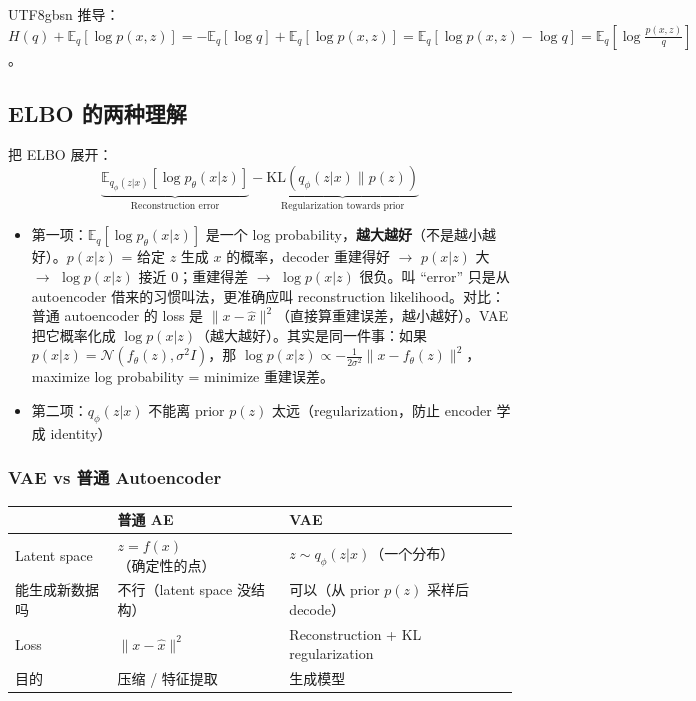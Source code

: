 \documentclass[11pt]{article}
\begin{document}
\begin{CJK}{UTF8}{gbsn}
推导：$H(q) + \mathbb{E}_q[\log p(x,z)] = -\mathbb{E}_q[\log q] + \mathbb{E}_q[\log p(x,z)] = \mathbb{E}_q[\log p(x,z) - \log q] = \mathbb{E}_q\!\left[\log \frac{p(x,z)}{q}\right]$。

\subsection{ELBO 的两种理解}

把 ELBO 展开：
\[
  \underbrace{\mathbb{E}_{q_\phi(z|x)}[\log p_\theta(x|z)]}_{\text{Reconstruction error}} - \underbrace{\mathrm{KL}(q_\phi(z|x) \| p(z))}_{\text{Regularization towards prior}}
\]

\begin{itemize}
  \item 第一项：$\mathbb{E}_q[\log p_\theta(x|z)]$ 是一个 log probability，\textbf{越大越好}（不是越小越好）。$p(x|z)$ = 给定 $z$ 生成 $x$ 的概率，decoder 重建得好 $\to$ $p(x|z)$ 大 $\to$ $\log p(x|z)$ 接近 0；重建得差 $\to$ $\log p(x|z)$ 很负。叫 ``error'' 只是从 autoencoder 借来的习惯叫法，更准确应叫 reconstruction likelihood。对比：普通 autoencoder 的 loss 是 $\|x - \hat{x}\|^2$（直接算重建误差，越小越好）。VAE 把它概率化成 $\log p(x|z)$（越大越好）。其实是同一件事：如果 $p(x|z) = \mathcal{N}(f_\theta(z), \sigma^2 I)$，那 $\log p(x|z) \propto -\frac{1}{2\sigma^2}\|x - f_\theta(z)\|^2$，maximize log probability = minimize 重建误差。
  \item 第二项：$q_\phi(z|x)$ 不能离 prior $p(z)$ 太远（regularization，防止 encoder 学成 identity）
\end{itemize}

\subsubsection{VAE vs 普通 Autoencoder}

\begin{center}
\begin{tabular}{l|l|l}
  & \textbf{普通 AE} & \textbf{VAE} \\
  \hline
  Latent space & $z = f(x)$（确定性的点） & $z \sim q_\phi(z|x)$（一个分布） \\
  能生成新数据吗 & 不行（latent space 没结构） & 可以（从 prior $p(z)$ 采样后 decode） \\
  Loss & $\|x - \hat{x}\|^2$ & Reconstruction + KL regularization \\
  目的 & 压缩 / 特征提取 & 生成模型 \\
\end{tabular}
\end{center}


\end{CJK}
\end{document}

